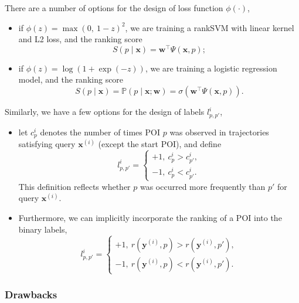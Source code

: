 \documentclass[9pt]{extarticle}
\begin{document}
There are a number of options for the design of loss function $\phi(\cdot)$,
\begin{itemize}
\item if $\phi(z) = \max(0,~ 1-z)^2$, we are training a rankSVM with linear kernel and L2 loss, and the ranking score 
      \begin{equation*}
      S(p \mid \mathbf{x})= \mathbf{w}^\top \Psi(\mathbf{x}, p);
      \end{equation*}
\item if $\phi(z) = \log(1 + \exp(-z))$, we are training a logistic regression model, and the ranking score
      \begin{equation*}
      S(p \mid \mathbf{x})= \mathbb{P}(p \mid \mathbf{x}; \mathbf{w}) = \sigma \left(\mathbf{w}^\top \Psi(\mathbf{x}, p) \right).
      \end{equation*}
\end{itemize}

Similarly, we have a few options for the design of labels $l_{p,p'}^i$,
\begin{itemize}
\item let $c_p^i$ denotes the number of times POI $p$ was observed in trajectories satisfying query $\mathbf{x}^{(i)}$ (except the start POI), and define
      \begin{equation*}
      l_{p,p'}^i = \begin{cases}
      +1,~ c_p^i > c_{p'}^i, \\
      -1,~ c_p^i < c_{p'}^i.
      \end{cases}
      \end{equation*}
      This definition reflects whether $p$ was occurred more frequently than $p'$ for query $\mathbf{x}^{(i)}$.
\item Furthermore, we can implicitly incorporate the ranking of a POI into the binary labels,
      \begin{equation*}
      l_{p,p'}^i = \begin{cases}
      +1,~ r(\mathbf{y}^{(i)}, p) > r(\mathbf{y}^{(i)}, p'), \\
      -1,~ r(\mathbf{y}^{(i)}, p) < r(\mathbf{y}^{(i)}, p').
      \end{cases}
      \end{equation*}
\end{itemize}



\subsubsection{Drawbacks}
\label{sec:drawback}
\end{document}
